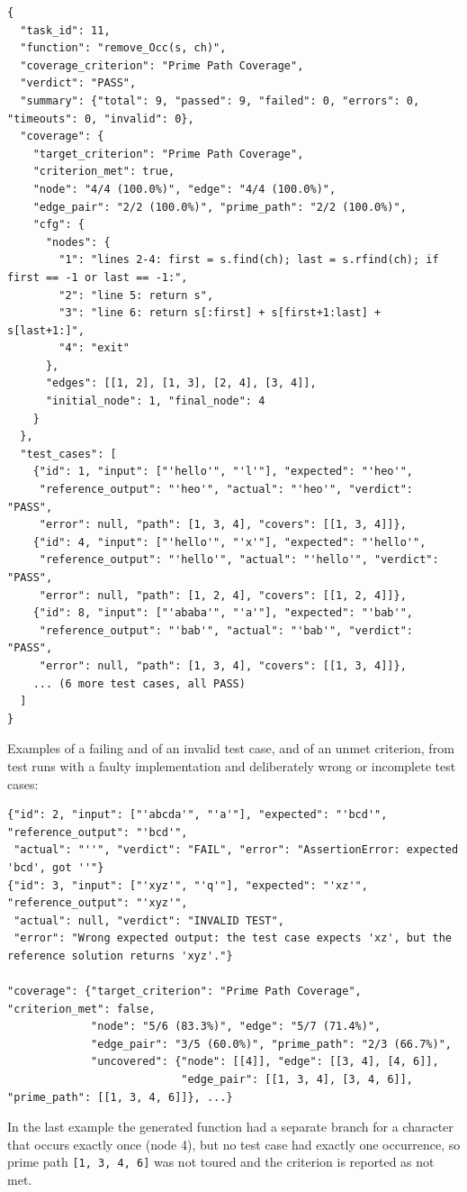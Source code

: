 \documentclass[12pt, a4paper]{article}
\begin{document}
\begin{lstlisting}[style=plain, caption={\texttt{execution\_results.json}, task 11}]
{
  "task_id": 11,
  "function": "remove_Occ(s, ch)",
  "coverage_criterion": "Prime Path Coverage",
  "verdict": "PASS",
  "summary": {"total": 9, "passed": 9, "failed": 0, "errors": 0, "timeouts": 0, "invalid": 0},
  "coverage": {
    "target_criterion": "Prime Path Coverage",
    "criterion_met": true,
    "node": "4/4 (100.0%)", "edge": "4/4 (100.0%)",
    "edge_pair": "2/2 (100.0%)", "prime_path": "2/2 (100.0%)",
    "cfg": {
      "nodes": {
        "1": "lines 2-4: first = s.find(ch); last = s.rfind(ch); if first == -1 or last == -1:",
        "2": "line 5: return s",
        "3": "line 6: return s[:first] + s[first+1:last] + s[last+1:]",
        "4": "exit"
      },
      "edges": [[1, 2], [1, 3], [2, 4], [3, 4]],
      "initial_node": 1, "final_node": 4
    }
  },
  "test_cases": [
    {"id": 1, "input": ["'hello'", "'l'"], "expected": "'heo'",
     "reference_output": "'heo'", "actual": "'heo'", "verdict": "PASS",
     "error": null, "path": [1, 3, 4], "covers": [[1, 3, 4]]},
    {"id": 4, "input": ["'hello'", "'x'"], "expected": "'hello'",
     "reference_output": "'hello'", "actual": "'hello'", "verdict": "PASS",
     "error": null, "path": [1, 2, 4], "covers": [[1, 2, 4]]},
    {"id": 8, "input": ["'ababa'", "'a'"], "expected": "'bab'",
     "reference_output": "'bab'", "actual": "'bab'", "verdict": "PASS",
     "error": null, "path": [1, 3, 4], "covers": [[1, 3, 4]]},
    ... (6 more test cases, all PASS)
  ]
}
\end{lstlisting}

Examples of a failing and of an invalid test case, and of an unmet criterion, from test runs with a faulty implementation and deliberately wrong or incomplete test cases:
\begin{lstlisting}[style=plain]
{"id": 2, "input": ["'abcda'", "'a'"], "expected": "'bcd'", "reference_output": "'bcd'",
 "actual": "''", "verdict": "FAIL", "error": "AssertionError: expected 'bcd', got ''"}
{"id": 3, "input": ["'xyz'", "'q'"], "expected": "'xz'", "reference_output": "'xyz'",
 "actual": null, "verdict": "INVALID TEST",
 "error": "Wrong expected output: the test case expects 'xz', but the reference solution returns 'xyz'."}

"coverage": {"target_criterion": "Prime Path Coverage", "criterion_met": false,
             "node": "5/6 (83.3%)", "edge": "5/7 (71.4%)",
             "edge_pair": "3/5 (60.0%)", "prime_path": "2/3 (66.7%)",
             "uncovered": {"node": [[4]], "edge": [[3, 4], [4, 6]],
                           "edge_pair": [[1, 3, 4], [3, 4, 6]], "prime_path": [[1, 3, 4, 6]]}, ...}
\end{lstlisting}
In the last example the generated function had a separate branch for a character that occurs exactly once (node 4), but no test case had exactly one occurrence, so prime path \texttt{[1, 3, 4, 6]} was not toured and the criterion is reported as not met.
\end{document}
